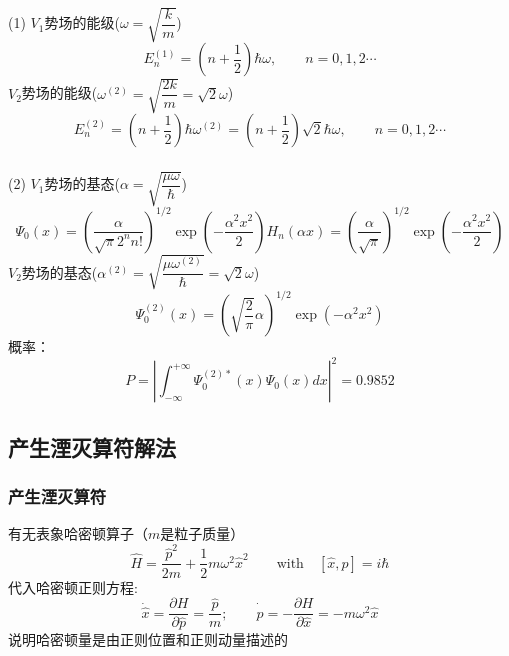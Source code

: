 \begin{frame}[label=current]
  \frametitle{}
  \解 (1) $V_1$势场的能级($\omega = \sqrt{\dfrac{k}{m}} $)
  \[ E^{(1)}_n = \left(n+\frac{1}{2}\right) \hbar \omega, \qquad n=0,1,2\cdots \]
  $V_2$势场的能级($\omega^{(2)} = \sqrt{\dfrac{2k}{m}} = \sqrt{2}\omega$)
  \[ E^{(2)}_n = \left(n+\frac{1}{2}\right) \hbar \omega^{(2)} = \left(n+\frac{1}{2}\right) \sqrt{2} \hbar \omega, \qquad n=0,1,2\cdots \]
\end{frame} 

\begin{frame}[label=current]
  \frametitle{}
  (2) $V_1$势场的基态($\alpha = \sqrt{\dfrac{\mu\omega}{\hbar}} $)
  \begin{equation*}
	  \Psi_0(x) = \left( \frac{\alpha}{\sqrt{\pi} 2^n n!}  \right) ^{1/2}  \exp(-\frac{ \alpha^2 x^2}{2} ) H_n( \alpha x) =  \left( \frac{\alpha}{\sqrt{\pi}}  \right) ^{1/2}  \exp(-\frac{ \alpha^2 x^2}{2} )
  \end{equation*}
  $V_2$势场的基态($\alpha ^{(2)} = \sqrt{\dfrac{\mu\omega ^{(2)}}{\hbar}} = \sqrt{2} \omega$)
  \begin{equation*}
	  \Psi ^{(2)}_0(x) =  \left( \sqrt{\frac{2}{\pi}} \alpha \right) ^{1/2}  \exp(-{ \alpha^2 x^2} )
  \end{equation*}
  概率： 
  \[ P = \left\vert\int_{-\infty}^{+\infty} \Psi ^{(2)*}_0(x) \Psi_0(x) d x\right\vert^2 =0.9852\]
\end{frame} 

\subsection{产生湮灭算符解法}
\begin{frame}
    \frametitle{产生湮灭算符}
    \解  有无表象哈密顿算子（$m$是粒子质量）
  \begin{equation*}
      \hat{H} = \frac{\hat{p}^2 }{2m} + \dfrac{1}{2} m \omega ^2 \hat{x}^2   \qquad \text{with} \quad [\hat{x},\hat{p}]=i\hbar 
  \end{equation*}	
  代入哈密顿正则方程: \\ 
  \[ \dot{\hat{x}} = \frac{\partial H }{\partial \hat{p} } =  \frac{{\hat{p}}}{m}; \qquad   \dot{\hat{p}} = - \frac{\partial H }{\partial \hat{x} } = -m \omega ^2 \hat{x} \]
  说明哈密顿量是由正则位置和正则动量描述的
\end{frame}

